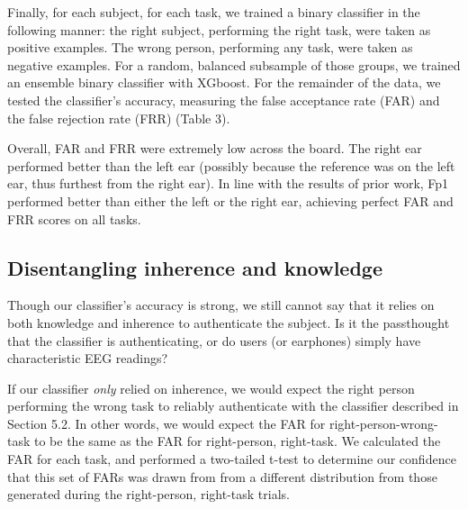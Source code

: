\documentclass[11pt]{article}
\begin{document}
Finally, for each subject, for each task, we trained a binary classifier 
in the following manner: the right subject, performing the right task, were taken
as positive examples. The wrong person, performing any task, were taken as negative
examples. For a random, balanced subsample of those groups, we trained an ensemble
binary classifier with XGboost. For the remainder of the data, we tested the 
classifier's accuracy, measuring the false acceptance rate (FAR) and the false
rejection rate (FRR) (Table 3).

Overall, FAR and FRR were extremely low across the board. The right ear 
performed better than the left ear (possibly because the reference was on
the left ear, thus furthest from the right ear). In line with the 
results of prior work, Fp1 performed better than either the left or the right ear,
achieving perfect FAR and FRR scores on all tasks.

\subsection{Disentangling inherence and knowledge}
\label{sec:orga057897}

Though our classifier's accuracy is strong, we still cannot say that it relies 
on both knowledge and inherence to authenticate the subject. Is it the passthought
that the classifier is authenticating, or do users (or earphones) simply have characteristic
EEG readings? 

If our classifier \emph{only} relied on inherence, we would expect the right person performing
the wrong task to reliably authenticate with the classifier described in Section 5.2.
In other words, we would expect the FAR for right-person-wrong-task to be the same 
as the FAR for right-person, right-task. We calculated the FAR for each task, and performed
a two-tailed t-test to determine our confidence that this set of FARs was drawn from
from a different distribution from those generated during the right-person, right-task trials.
\end{document}

